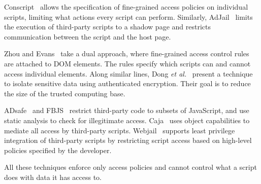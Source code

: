 Conscript~\cite{conscript} allows the specification of fine-grained
access policies on individual scripts, limiting what actions every
script can perform. Similarly, AdJail~\cite{adjail} limits the
execution of third-party scripts to a shadow page and restricts
communication between the script and the host page.

Zhou and Evans~\cite{zhouESORICS11} take a dual approach, where
fine-grained access control rules are attached to DOM elements. The
rules specify which scripts can and cannot access individual
elements. Along similar lines, Dong \emph{et al.}~\cite{ccs13crypton}
present a technique to isolate sensitive data using authenticated
encryption. Their goal is to reduce the size of the trusted computing
base.

ADsafe~\cite{adsafe} and FBJS~\cite{fbjs} restrict third-party code to
subsets of JavaScript, and use static analysis to check for
illegitimate access. Caja~\cite{caja} uses object capabilities to
mediate all access by third-party scripts. Webjail~\cite{webjail}
supports least privilege integration of third-party scripts by
restricting script access based on high-level policies specified by
the developer.

All these techniques enforce only access policies and cannot control
what a script does with data it has access to.


